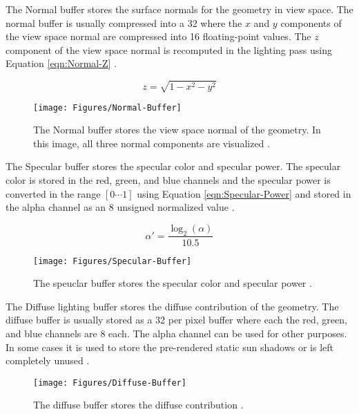 The Normal buffer stores the surface normals for the geometry in view space. The normal buffer is usually compressed into a \SI{32}{\bit} where the $x$ and $y$ components of the view space normal are compressed into \SI{16}{\bit} floating-point values. The $z$ component of the view space normal is recomputed in the lighting pass using Equation \ref{eqn:Normal-Z} \parencite{42_hargreaves_harris_2004, 10_vanderleeuw_2007}.

\begin{equation}
z=\sqrt{1-x^2-y^2}
\label{eqn:Normal-Z}
\end{equation}

\begin{figure}[H]
\centering
\texttt{[image: Figures/Normal-Buffer]}
\decoRule
\caption{The Normal buffer stores the view space normal of the geometry. In this image, all three normal components are visualized \parencite{17_vanoosten_2015}.}
\label{fig:Normal-Buffer}
\end{figure}

The Specular buffer stores the specular color and specular power. The specular color is stored in the red, green, and blue channels and the specular power is converted in the range $[0\cdots 1]$ using Equation \ref{eqn:Specular-Power} and stored in the alpha channel as an \SI{8}{\bit} unsigned normalized value \parencite{10_vanderleeuw_2007}.

\begin{equation}
\alpha'=\frac{\log_2(\alpha)}{10.5}
\label{eqn:Specular-Power}
\end{equation}

\begin{figure}[H]
\centering
\texttt{[image: Figures/Specular-Buffer]}
\decoRule
\caption{The speuclar buffer stores the specular color and specular power \parencite{17_vanoosten_2015}.}
\label{fig:Specular-Buffer}
\end{figure}

The Diffuse lighting buffer stores the diffuse contribution of the geometry. The diffuse buffer is usually stored as a \SI{32}{\bit} per pixel buffer where each the red, green, and blue channels are \SI{8}{\bit} each. The alpha channel can be used for other purposes. In some cases it is used to store the pre-rendered static sun shadows \parencite{10_vanderleeuw_2007} or is left completely unused \parencite{42_hargreaves_harris_2004}.

\begin{figure}[H]
\centering
\texttt{[image: Figures/Diffuse-Buffer]}
\decoRule
\caption{The diffuse buffer stores the diffuse contribution \parencite{17_vanoosten_2015}.}
\label{fig:Diffuse-Buffer}
\end{figure}

